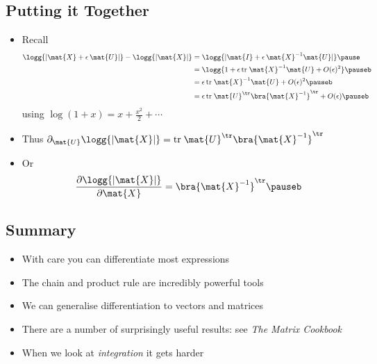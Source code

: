 
\begin{slide}
\section[-2]{Putting it Together}

\begin{PauseHighLight}
  \begin{itemize}
  \item Recall
    \begin{align*}
      \logg{|\mat{X}+\epsilon\,\mat{U}|} - \logg{|\mat{X}|}
      &= \logg{|\mat{I} + \epsilon\,\mat{X}^{-1}\mat{U}|}\pause \\
      &= \logg{1 + \epsilon \, \mathrm{tr}\; \mat{X}^{-1}\mat{U}+
        O(\epsilon)^2}\pauseb\\
        &=  \epsilon \, \mathrm{tr}\; \mat{X}^{-1}\mat{U}+
        O(\epsilon)^2\pauseb\\
        &= \epsilon \, \mathrm{tr}\; \mat{U}^\tr \bra{\mat{X}^{-1}}^\tr+ O(\epsilon)\pauseb
    \end{align*}
    using $\log(1+x) = x + \tfrac{x^2}{2} +
    \cdots$\pause {}
    \item Thus $\partial_{\mat{U}} \logg{|\mat{X}|} = \mathrm{tr}\;
      \mat{U}^\tr \bra{\mat{X}^{-1}}^\tr$\pauseb
    \item Or
      \begin{align*}
        \frac{\partial \logg{|\mat{X}|}}{\partial \mat{X}} =  \bra{\mat{X}^{-1}}^\tr\pauseb
      \end{align*}

  \end{itemize}
\end{PauseHighLight}

\end{slide}



\begin{slide}
\section{Summary}
  
\begin{PauseHighLight}
  \begin{itemize}
  \item With care you can differentiate most expressions\pause
  \item The chain and product rule are incredibly powerful tools\pause
  \item We can generalise differentiation to vectors and
    matrices\pause
  \item There are a number of surprisingly useful results\pause: see
    \emph{The Matrix Cookbook}\pauseb
  \item When we look at \emph{integration} it gets harder\pauseb
  \end{itemize}
\end{PauseHighLight}

\end{slide}

